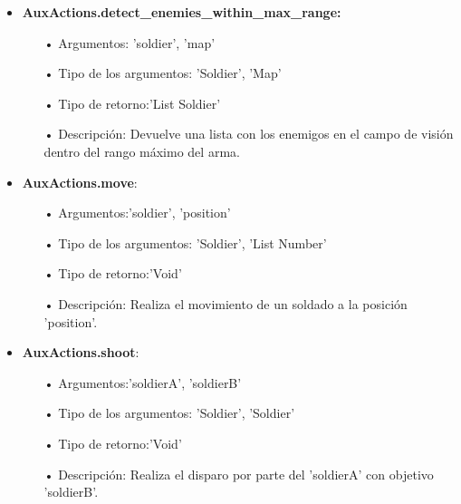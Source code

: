 \documentclass[twoside]{article}
\begin{document}
\begin{itemize}
			\item \textbf{AuxActions.detect\_enemies\_within\_max\_range:\\}
			\begin{itemize}
				\item[•] Argumentos: 'soldier', 'map'\\
				\item[•] Tipo de los argumentos: 'Soldier', 'Map'\\ 
				\item[•] Tipo de retorno:'List Soldier'\\
				\item[•] Descripci\'on: Devuelve una lista con los enemigos en el campo de visi\'on dentro del rango m\'aximo del arma.  
			\end{itemize}\vspace{0.2cm}
			
			
			\item \textbf{AuxActions.move}:\\
			\begin{itemize}
				\item[•] Argumentos:'soldier', 'position'\\
				\item[•] Tipo de los argumentos: 'Soldier', 'List Number'\\ 
				\item[•] Tipo de retorno:'Void'\\
				\item[•] Descripci\'on: Realiza el movimiento de un soldado a la posici\'on 'position'.
			\end{itemize}\vspace{0.2cm}
			
			\item \textbf{AuxActions.shoot}:\\
			\begin{itemize}
				\item[•] Argumentos:'soldierA', 'soldierB'\\
				\item[•] Tipo de los argumentos: 'Soldier', 'Soldier'\\ 
				\item[•] Tipo de retorno:'Void'\\
				\item[•] Descripci\'on: Realiza el disparo por parte del 'soldierA' con objetivo 'soldierB'.
			\end{itemize}\vspace{0.2cm}
			

\end{itemize}
\end{document}
